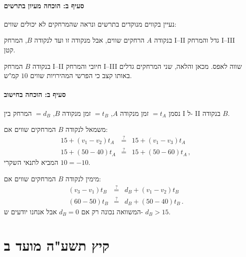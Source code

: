 \documentclass[12pt,a4paper]{article}
\newcommand*{\p}[1]{\textsf{\small #1}}
\begin{document}
\paragraph{סעיף ב: הוכחה מעיון בתרשים}
\mbox{}

נעיין בקווים מנוקדים בתרשים ונראה שהמרחקים לא יכולים שווים:

\smallskip

בנקודה
$A$
הרחקים שווים, אבל מנקודה זו ועד לנקודה
$B$,
המרחק 
\p{I--II}
גדל והמרחק
\p{I--III}
קטן.

\smallskip

בנקודה
$B$
המרחק 
\p{I--II}
חיובי והמרחק
\p{I--III}
שווה לאפס. מכאן והלאה, שני המרחקים גדלים באותו קצב כי הפרשי המהירויות שווים
$10$
קמ"ש.


\paragraph{סעיף ב: הוכחה בחישוב}
\mbox{}

נסמן
$=t_A$
זמן מנקודה
$A$,
$=t_B$
זמן מנקודה
$B$,
$=d_B$
המרחק בין
\p{I}
ל-
\p{II}
בנקודה
$B$.

\smallskip

משמאל לנקודה
$B$
המרחקים שווים אם:
\begin{eqnarray*}
15 + (v_1-v_2)t_A &\stackrel{?}{=}& 15 + (v_1-v_3)t_A\\
15+(50-40)t_A &\stackrel{?}{=}& 15+(50-60)t_A\,,
\end{eqnarray*}
המביא לתנאי השקרי
$10=-10$.

\smallskip

מימין לנקודה
$B$
המרחקים שווים אם:
\begin{eqnarray*}
(v_3-v_1)t_B &\stackrel{?}{=}& d_B + (v_1-v_2)t_B\\
(60-50)t_B &\stackrel{?}{=}& d_B + (50-40)t_B\,.
\end{eqnarray*}
המשוואה נכונה רק אם
$d_B=0$
אבל אנחנו יודעים ש-
$d_B > 15$.

\newpage


\section*{קיץ תשע"ה מועד ב}
\end{document}
